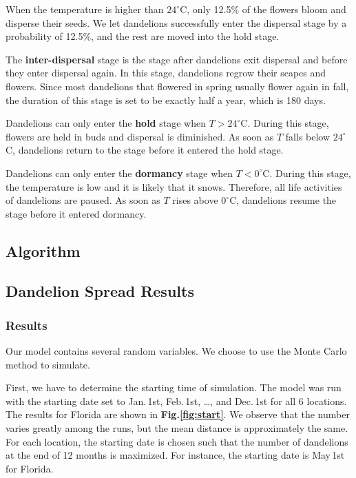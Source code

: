\documentclass[12pt]{article}
\begin{document}
		When the temperature is higher than $24^\circ$C, only 12.5\% of the flowers bloom and disperse their seeds.  We let dandelions successfully enter the dispersal stage by a probability of 12.5\%, and the rest are moved into the hold stage.
		
		The \textbf{inter-dispersal} stage is the stage after dandelions exit dispersal and before they enter dispersal again.  In this stage, dandelions regrow their scapes and flowers.  Since most dandelions that flowered in spring usually flower again in fall, the duration of this stage is set to be exactly half a year, which is 180 days.  
		
		Dandelions can only enter the \textbf{hold} stage when $T > 24^\circ$C.  During this stage, flowers are held in buds and dispersal is diminished.  As soon as $T$ falls below $24^\circ$C, dandelions return to the stage before it entered the hold stage.  
		
		Dandelions can only enter the \textbf{dormancy} stage when $T < 0^\circ$C.  During this stage, the temperature is low and it is likely that it snows.  Therefore, all life activities of dandelions are paused.  As soon as $T$ rises above $0^\circ$C, dandelions resume the stage before it entered dormancy.
		
	\subsection{Algorithm}
	
	\subsection{Dandelion Spread Results}
	
		\subsubsection{Results}
		
			Our model contains several random variables.  We choose to use the Monte Carlo method to simulate.
			
			First, we have to determine the starting time of simulation.  The model was run with the starting date set to Jan.\,1st, Feb.\,1st, \ldots, and Dec.\,1st for all 6 locations.  The results for Florida are shown in \textbf{Fig.\ref{fig:start}}.  We observe that the number varies greatly among the runs, but the mean distance is approximately the same.  For each location, the starting date is chosen such that the number of dandelions at the end of 12 months is maximized.  For instance, the starting date is May\,1st for Florida.  
			
\end{document}

